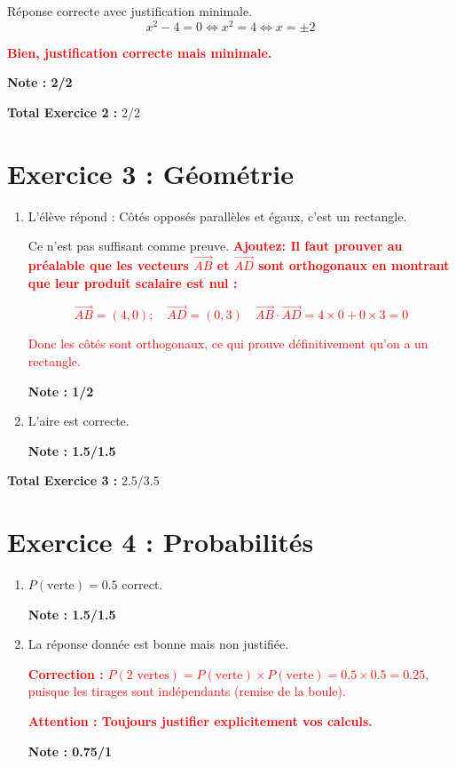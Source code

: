 \documentclass{article}
\begin{document}
Réponse correcte avec justification minimale.
\[
x^2 - 4 = 0 \Longleftrightarrow x^2 = 4 \Longleftrightarrow x = \pm 2
\]

\textcolor{red}{\textbf{Bien, justification correcte mais minimale.}}

\textbf{Note : 2/2}

\textbf{Total Exercice 2 :} 2/2

\section*{Exercice 3 : Géométrie}

\begin{enumerate}
    \item L'élève répond : Côtés opposés parallèles et égaux, c'est un rectangle.
    
    Ce n'est pas suffisant comme preuve.\textcolor{red}{\textbf{ Ajoutez: Il faut prouver au préalable que les vecteurs $\overrightarrow{AB}$ et $\overrightarrow{AD}$ sont orthogonaux en montrant que leur produit scalaire est nul :}}
    
    \textcolor{red}{
    \[
    \overrightarrow{AB}=(4,0);\quad \overrightarrow{AD}=(0,3)\quad  \overrightarrow{AB}\cdot \overrightarrow{AD}=4\times 0+0\times 3=0
    \]}
    
    \textcolor{red}{ Donc les côtés sont orthogonaux, ce qui prouve définitivement qu'on a un rectangle.}
    
    \textbf{Note : 1/2}
    
    \item L'aire est correcte.
    
    \textbf{Note : 1.5/1.5}
\end{enumerate}

\textbf{Total Exercice 3 :} 2.5/3.5

\section*{Exercice 4 : Probabilités}

\begin{enumerate}
    \item $P(\text{verte})=0.5$ correct.
    
    \textbf{Note : 1.5/1.5}
    
    \item La réponse donnée est bonne mais non justifiée.
    
    \textcolor{red}{\textbf{Correction : }}\textcolor{red}{
    $P(\text{2 vertes})=P(\text{verte})\times P(\text{verte})=0.5\times 0.5=0.25,$ puisque les tirages sont indépendants (remise de la boule).}

    \textcolor{red}{\textbf{Attention : Toujours justifier explicitement vos calculs.}}

    \textbf{Note : 0.75/1}
\end{enumerate}
\end{document}
